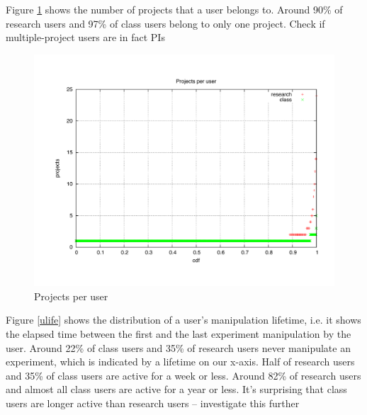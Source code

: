 \documentclass[10pt]{article}
\begin{document}
Figure \ref{uproj} shows the number of projects that a user belongs to. Around 90\% of research users and 97\% of class users belong to only one project. 
{\color{red} Check if multiple-project users are in fact PIs}

\begin{figure}[htbp]
\begin{center}
\includegraphics[width=5in]{figs/uproj.pdf}
\caption{Projects per user}
\label{uproj}
\end{center}
\end{figure}

Figure \ref{ulife} shows the distribution of a user's manipulation lifetime, i.e. it shows the elapsed time between the first and the last experiment manipulation by the user. Around 22\% of class users and 35\% of research users never manipulate an experiment, which is indicated by a lifetime on our x-axis. Half of research users and 35\% of class users are active for a week or less. Around 82\% of research users and almost all class users are active for a year or less. 
{\color{red} It's surprising that class users are longer active than research users -- investigate this further}
\end{document}
